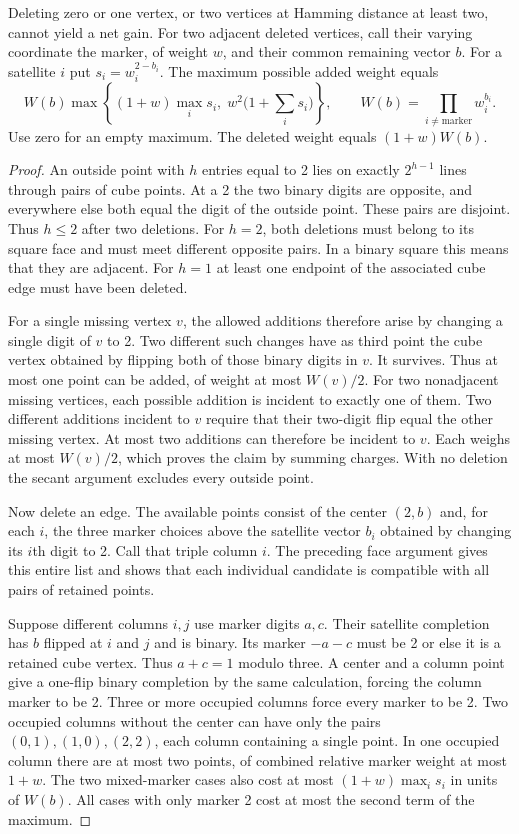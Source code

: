 \begin{theorem}\label{th:edge}
Deleting zero or one vertex, or two vertices at Hamming distance at least two, cannot yield a net gain. For two adjacent deleted vertices, call their varying coordinate the marker, of weight $w$, and their common remaining vector $b$. For a satellite $i$ put $s_i=w_i^{2-b_i}$. The maximum possible added weight equals
\[
 W(b)\max\!\left\{(1+w)\max_i s_i,\;
               w^2\Big(1+\sum_i s_i\Big)\right\},\qquad
 W(b)=\prod_{i\ne\mathrm{marker}} w_i^{b_i}.
\]
Use zero for an empty maximum. The deleted weight equals $(1+w)W(b)$.
\end{theorem}

\begin{proof}
An outside point with $h$ entries equal to 2 lies on exactly $2^{h-1}$ lines through pairs of cube points. At a 2 the two binary digits are opposite, and everywhere else both equal the digit of the outside point. These pairs are disjoint. Thus $h\le2$ after two deletions. For $h=2$, both deletions must belong to its square face and must meet different opposite pairs. In a binary square this means that they are adjacent. For $h=1$ at least one endpoint of the associated cube edge must have been deleted.

For a single missing vertex $v$, the allowed additions therefore arise by changing a single digit of $v$ to 2. Two different such changes have as third point the cube vertex obtained by flipping both of those binary digits in $v$. It survives. Thus at most one point can be added, of weight at most $W(v)/2$. For two nonadjacent missing vertices, each possible addition is incident to exactly one of them. Two different additions incident to $v$ require that their two-digit flip equal the other missing vertex. At most two additions can therefore be incident to $v$. Each weighs at most $W(v)/2$, which proves the claim by summing charges. With no deletion the secant argument excludes every outside point.

Now delete an edge. The available points consist of the center $(2,b)$ and, for each $i$, the three marker choices above the satellite vector $b_i$ obtained by changing its $i$th digit to 2. Call that triple column $i$. The preceding face argument gives this entire list and shows that each individual candidate is compatible with all pairs of retained points.

Suppose different columns $i,j$ use marker digits $a,c$. Their satellite completion has $b$ flipped at $i$ and $j$ and is binary. Its marker $-a-c$ must be 2 or else it is a retained cube vertex. Thus $a+c=1$ modulo three. A center and a column point give a one-flip binary completion by the same calculation, forcing the column marker to be 2. Three or more occupied columns force every marker to be 2. Two occupied columns without the center can have only the pairs $(0,1),(1,0),(2,2)$, each column containing a single point. In one occupied column there are at most two points, of combined relative marker weight at most $1+w$. The two mixed-marker cases also cost at most $(1+w)\max_i s_i$ in units of $W(b)$. All cases with only marker 2 cost at most the second term of the maximum.


\end{proof}
